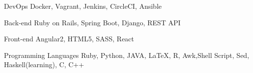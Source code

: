 

\begin{cvskills}

  \cvskill
    {DevOps} %
    { Docker, Vagrant, Jenkins, CircleCI, Ansible} %

  \cvskill
    {Back-end} %
    {Ruby on Rails, Spring Boot, Django, REST API} %

  \cvskill
    {Front-end} %
    {Angular2, HTML5, SASS, React} %

  \cvskill
    {Programming Languages} %
    {Ruby, Python, JAVA, LaTeX, R, Awk,Shell Script, Sed, Haskell(learning), C, C++} %

\end{cvskills}
